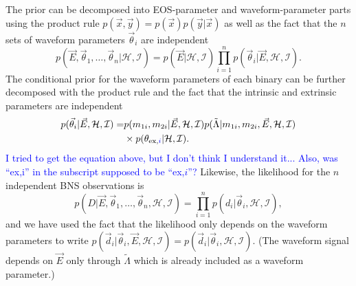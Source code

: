 \documentclass[twocolumn,prd,amssymb,aps,nofootinbib,showpacs,epsf]{revtex4}
\newcommand\les[2]{\textcolor{blue}{{#1}\sout{#2}}}
\begin{document}
The prior can be decomposed into EOS-parameter and waveform-parameter parts using the product rule $p(\vec x, \vec y) = p(\vec x) p(\vec y | \vec x) $ as well as the fact that the $n$ sets of waveform parameters $\vec\theta_i$ are independent
\begin{equation}
p(\vec E,\vec\theta_1,\dots,\vec\theta_n | \mathcal{H},\mathcal{I}) = p(\vec E | \mathcal{H},\mathcal{I}) \prod_{i=1}^n p(\vec\theta_i | \vec E, \mathcal{H},\mathcal{I}).
\end{equation} 
The conditional prior for the waveform parameters of each binary can be further decomposed with the product rule and the fact that the intrinsic and extrinsic parameters are independent
\begin{equation}
\begin{split}
p(\vec\theta_i | \vec E, \mathcal{H},\mathcal{I}) =& p(m_{1i}, m_{2i} | \vec E, \mathcal{H},\mathcal{I}) p(\tilde\Lambda | m_{1i}, m_{2i}, \vec E, \mathcal{H},\mathcal{I})\\
&\times p(\theta_{{\rm ex,}\textcolor{blue}i} | \mathcal{H}, \mathcal{I}).
\end{split}
\end{equation}
\les{I tried to get the equation above, but I don't think I understand it...  Also, was ``ex,i'' in the subscript supposed to be ``ex,$i$''?}{}  Likewise, the likelihood for the $n$ independent BNS observations is
\begin{equation}
p(D | \vec E,\vec\theta_1,\dots,\vec\theta_n, \mathcal{H},\mathcal{I}) = \prod_{i=1}^n p(d_i | \vec\theta_i, \mathcal{H},\mathcal{I}),
\end{equation}
and we have used the fact that the likelihood only depends on the waveform parameters to write $p(\vec d_i | \vec\theta_i, \vec E,\mathcal{H},\mathcal{I}) = p(\vec d_i | \vec\theta_i,\mathcal{H},\mathcal{I})$. (The waveform signal depends on $\vec E$ only through $\tilde\Lambda$ which is already included as a waveform parameter.)
\end{document}
